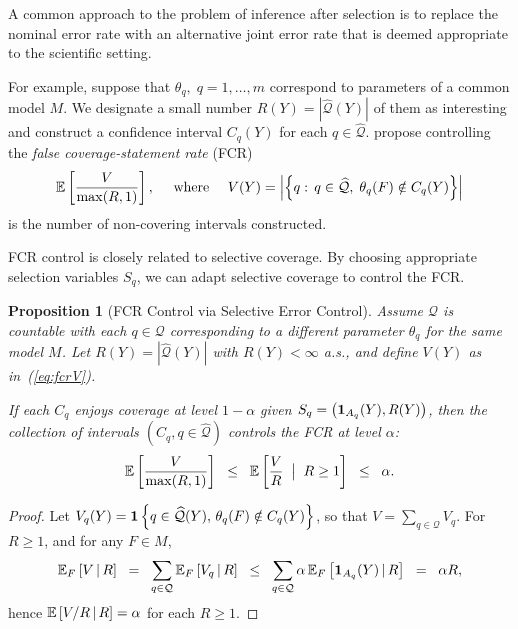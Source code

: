 \documentclass{article}
\newtheorem{proposition}[theorem]{Proposition}
\theoremstyle{definition}
\newcommand{\cQ}{\mathcal{Q}}
\newcommand{\hcQ}{\widehat{\mathcal{Q}}}
\newcommand{\Gv}{\;\;\big|\;\;}
\begin{document}
A common approach to the problem of inference after selection is to replace the nominal error rate with an alternative joint error rate that is deemed appropriate to the scientific setting.

For example, suppose that $\theta_q,\;q=1,\ldots,m$ correspond to parameters of a common model $M$. We designate a small number $R(Y)=|\hcQ(Y)|$ of them as interesting and construct a confidence interval $C_q(Y)$ for each $q\in \hcQ$. \citet{benjamini2005false} propose controlling the {\em false coverage-statement rate} (FCR)
\begin{equation}\label{eq:fcrV}
  \E\left[\frac{V}{\max(R,1)}\right],\quad \text{ where }\quad
  V(Y) = \left|\left\{q:\, q\in\hcQ, \;\theta_q(F) \notin C_q(Y)\right\}\right|
\end{equation}
is the number of non-covering intervals constructed.

FCR control is closely related to selective coverage. By choosing appropriate selection variables $S_q$, we can adapt selective coverage to control the FCR.

\begin{proposition}[FCR Control via Selective Error Control]\label{prop:fcrCont}
  Assume $\cQ$ is countable with each $q\in \cQ$ corresponding to a different parameter $\theta_q$ for the same model $M$. Let $R(Y) = |\hcQ(Y)|$ with $R(Y)<\infty$ a.s., and define $V(Y)$ as in~(\ref{eq:fcrV}).

If each $C_q$ enjoys coverage at level $1-\alpha$ given $S_q = \left(\mathbf{1}_{A_q}(Y),R(Y)\right)$, then the collection of intervals $(C_q, q\in \hcQ)$ controls the FCR at level $\alpha$:
\begin{equation}
  \E\left[\frac{V}{\max(R,1)}\right] \;\;\leq\;\;
  \E\left[\frac{V}{R} \Gv R \geq 1\right] \;\;\leq\;\; \alpha.
\end{equation}
\end{proposition}
\begin{proof}
  Let $V_q(Y) = \1\left\{q\in \hcQ(Y),\, \theta_q(F) \notin C_q(Y)\right\}$,
so that $V = \sum_{q\in\cQ}V_q$.  For $R\geq 1$, and for any $F\in M$,
  \begin{equation}
    \E_F\left[V \gv R \right]
    \;\;=\;\; \sum_{q\in\cQ} \E_F\left[ V_q \gv R\right]
    \;\;\leq\;\; \sum_{q\in\cQ}
    \alpha\,\E_F\left[ \1_{A_q}(Y) \gv R\right]
    \;\;=\;\; \alpha R,
  \end{equation}
  hence $\mathbb{E}\left[V/R \,|\, R\right] = \alpha$ for each $R\geq 1$.
\end{proof}
\end{document}
